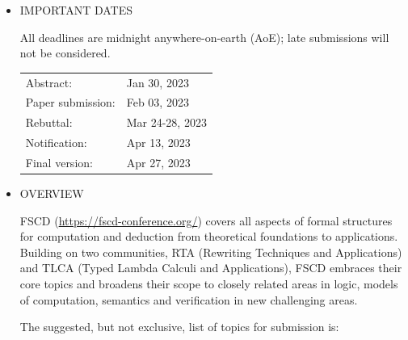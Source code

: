 \documentclass[prodmode,acmtecs]{acmsmall} %
\begin{document}
\begin{itemize}\item  IMPORTANT DATES 
 
  All deadlines are midnight anywhere-on-earth (AoE); late submissions will not be considered. 
 
\begin{tabulary}{\linewidth}{LL}Abstract:  & Jan 30, 2023 \\
Paper submission:  & Feb 03, 2023 \\
Rebuttal:  & Mar 24-28, 2023 \\
Notification:  & Apr 13, 2023 \\
Final version:  & Apr 27, 2023 \\
\end{tabulary}
 
\item  OVERVIEW 
 
  FSCD (\href{https://fscd-conference.org/}{https://fscd-conference.org/}) covers all aspects of formal structures for computation and deduction from theoretical foundations to applications. Building on two communities, RTA (Rewriting Techniques and Applications) and TLCA (Typed Lambda Calculi and Applications), FSCD embraces their core topics and broadens their scope to closely related areas in logic, models of computation, semantics and verification in new challenging areas. 
 
  The suggested, but not exclusive, list of topics for submission is:  
 

\end{itemize}
\end{document}

